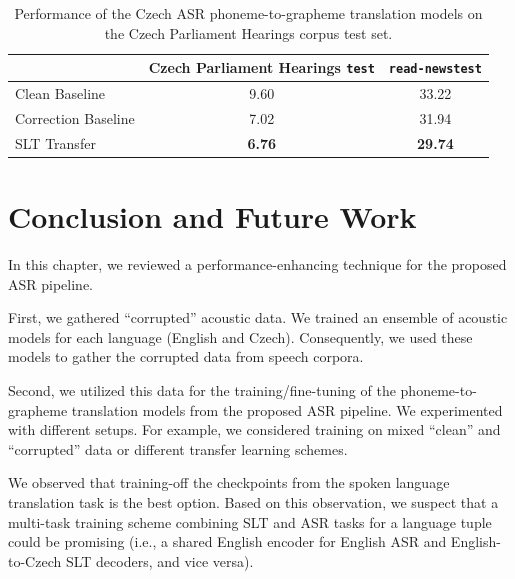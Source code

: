 \begin{table}[t]
	\centering
	\begin{tabular}{l|cc}
		&  Czech Parliament Hearings \texttt{test} & \texttt{read-newstest} \\ \midrule
		Clean Baseline             & 9.60       &     33.22         \\
		
		Correction Baseline             & 7.02   & 31.94           \\
		
		SLT Transfer     & \textbf{6.76}   & \textbf{29.74}  \\
	\end{tabular}   
	\caption{Performance of the Czech ASR phoneme-to-grapheme translation models on the Czech Parliament Hearings corpus test set.}
	\label{tab:werstrain_cs}
\end{table}


\section{Conclusion and Future Work}
In this chapter, we reviewed a performance-enhancing technique for the proposed ASR pipeline.

First, we gathered ``corrupted'' acoustic data. We trained an ensemble of acoustic models for each language (English and Czech). Consequently, we used these models to gather the corrupted data from speech corpora.

Second, we utilized this data for the training/fine-tuning of the phoneme-to-gra\-pheme translation models from the proposed ASR pipeline. We experimented with different setups. For example, we considered training on mixed ``clean'' and ``corrupted'' data or different transfer learning schemes.

We observed that training-off the checkpoints from the spoken language translation task is the best option. Based on this observation, we suspect that a multi-task training scheme combining SLT and ASR tasks for a language tuple could be promising (i.e., a shared English encoder for English ASR and English-to-Czech SLT decoders, and vice versa).

